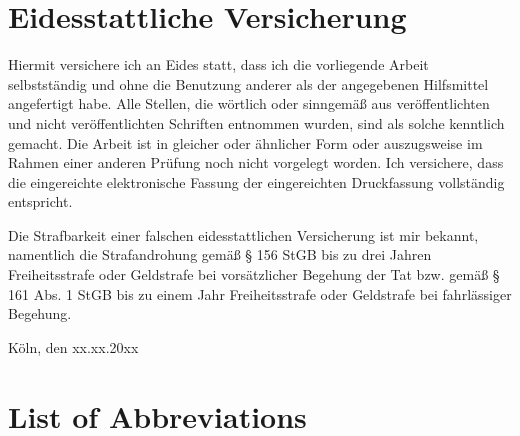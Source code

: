 \documentclass[a4paper, twoside, 12pt]{article}
\begin{document}
\section*{Eidesstattliche Versicherung}
\label{sec:SOOA}

\vspace{2.5cm}


Hiermit versichere ich an Eides statt, dass ich die vorliegende Arbeit selbstständig und ohne die Benutzung anderer als der angegebenen Hilfsmittel angefertigt habe. Alle Stellen, die wörtlich oder sinngemäß aus veröffentlichten und nicht veröffentlichten Schriften entnommen wurden, sind als solche kenntlich gemacht. Die Arbeit ist in gleicher oder ähnlicher Form oder auszugsweise im Rahmen einer anderen Prüfung noch nicht vorgelegt worden. Ich versichere, dass die eingereichte elektronische Fassung der eingereichten Druckfassung vollständig entspricht.

\vspace{1cm}

\noindent
Die Strafbarkeit einer falschen eidesstattlichen Versicherung ist mir bekannt, namentlich die Strafandrohung gemäß § 156 StGB bis zu drei Jahren Freiheitsstrafe oder Geldstrafe bei vorsätzlicher Begehung der Tat bzw. gemäß § 161 Abs. 1 StGB bis zu einem Jahr Freiheitsstrafe oder Geldstrafe bei fahrlässiger Begehung.

\vspace{3cm}
\noindent
\textbf{\@author{}}

\vspace{0.5cm}
\noindent
Köln, den xx.xx.20xx
\clearpage

\setcounter{page}{1}
\tableofcontents
\clearpage
\listoffigures
\clearpage
\listoftables
\clearpage
{}

\section*{List of Abbreviations} 
\begin{acronym}[GCRM]
\end{acronym}
\clearpage
\end{document}
